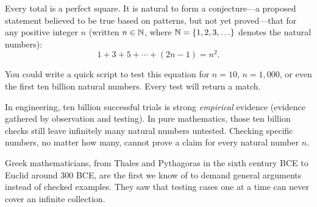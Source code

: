 Every total is a perfect square. It is natural to form a conjecture---a proposed statement believed to be true based on patterns, but not yet proved---that for any positive integer $n$ (written $n \in \mathbb{N}$, where $\mathbb{N} = \{1, 2, 3, \ldots\}$ denotes the natural numbers):
\[
1 + 3 + 5 + \cdots + (2n - 1) = n^2.
\]

You could write a quick script to test this equation for $n = 10$, $n = 1{,}000$, or even the first ten billion natural numbers. Every test will return a match.

In engineering, ten billion successful trials is strong \emph{empirical} evidence (evidence gathered by observation and testing). In pure mathematics, those ten billion checks still leave infinitely many natural numbers untested. Checking specific numbers, no matter how many, cannot prove a claim for every natural number $n$.

Greek mathematicians, from Thales and Pythagoras in the sixth century BCE to Euclid around 300 BCE, are the first we know of to demand general arguments instead of checked examples. They saw that testing cases one at a time can never cover an infinite collection.


